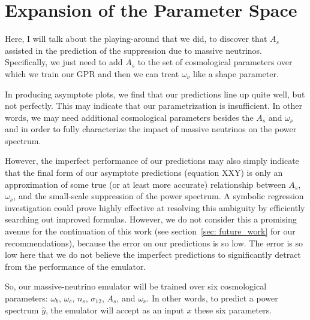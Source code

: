 \chapter{Expansion of the Parameter Space}
\label{chap: A_s}


Here, I will talk about the playing-around that we did, to discover that
$A_s$ assisted in the prediction of the suppression due to massive neutrinos.
Specifically, we just need to add $A_s$ to the set of cosmological parameters
over which we train our GPR and then we can treat $\omega_\nu$ like a shape
parameter.

In producing asymptote plots, we find that our predictions line up quite well,
but not perfectly. This may indicate that our parametrization is insufficient.
In other words, we may need additional cosmological parameters besides the
$A_s$ and $\omega_\nu$ and in order to fully characterize the impact of
massive neutrinos on the power spectrum.

However, the imperfect performance of our predictions may also simply
indicate that the final form of our asymptote predictions (equation XXY) is
only an approximation of some true (or at least more accurate) relationship
between $A_s$, $\omega_\nu$, and the small-scale suppression of the power
spectrum. A symbolic regression investigation could prove highly effective at
resolving this ambiguity by efficiently searching out improved formulas. 
However, we do not consider this a promising avenue
for the continuation of this work (see section~\ref{sec: future_work} for our
recommendations), because the error on our predictions is so low. The error
is so low here that we do not believe the imperfect predictions to
significantly detract from the performance of the emulator.


So, our massive-neutrino emulator will be trained over six cosmological
parameters: $\omega_b$, $\omega_c$, $n_s$, $\sigma_{12}$, $A_s$, and
$\omega_\nu$. In other words, to predict a power
spectrum $\hat{y}$, the emulator will accept as an input $x$ these six
parameters.

